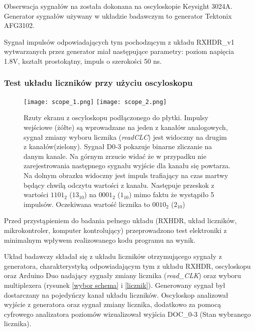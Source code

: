 Obserwacja sygnałów na została dokonana na oscyloskopie Keysight 3024A. Generator sygnałów używany w układzie badawczym to generator Tektonix AFG3102.

Sygnał impulsów odpowiadających tym pochodzącym z układu RXHDR\_v1 wytwarzanych przez generator miał następujące parametry: poziom napięcia 1.8V, kształt prostokątny, impuls o szerokości 50 ns.

\subsubsection{Test układu liczników przy użyciu oscyloskopu}

\begin{figure}
        \texttt{[image: scope\_1.png]}
        \texttt{[image: scope\_2.png]}
        \caption{Rzuty ekranu z oscyloskopu podłączonego do płytki. 
        Impulsy wejściowe (żółte) są wprowadzane na jeden z kanałów analogowych, sygnał zmiany wyboru licznika (\textit{readCLC}) jest widoczny na drugim z kanałów(zielony). 
        Sygnał D0-3 pokazuje binarne zliczanie na danym kanale. 
        Na górnym zrzucie widać że w przypadku nie zarejestrowania następnego sygnału wyjście dla kanału się powtarza. 
        Na dolnym obrazku widoczny jest impuls trafiający na czas martwy będący chwilą odczytu wartości z kanału.
        Następuje przeskok z wartości $1101_{2}$ ($13_{10}$) na $0001_{2}$ ($1_{10}$) mimo faktu że wystąpiło 5 impulsów. Oczekiwana wartość licznika to $0010_2$ ($2_{10}$)
        }
        \label{Oscyloskop}
\end{figure}

Przed przystąpieniem do badania pełnego układu (RXHDR, układ liczników, mikrokontroler, komputer kontrolujący) przeprowadzono test elektroniki z minimalnym wpływem realizowanego kodu programu na wynik. 

Układ badawczy składał się z układu liczników  otrzymującego sygnały z generatora, charakterystyką odpowiadającym tym z układu RXHDR, oscyloskopu oraz Arduino Duo nadający sygnały zmiany licznika (\textit{read\_CLK}) oraz wyboru multiplexera (rysunek \ref{wybor schema} i \ref{licznik}). Generowany sygnał był dostarczany na pojedyńczy kanał układu liczników. 
Oscyloskop analizował wyjście z generatora oraz sygnał zmiany licznika, dodatkowo za pomocą cyfrowego analizatora poziomów wizualizował wyjścia DOC\_0-3 (Stan wybranego licznika).

